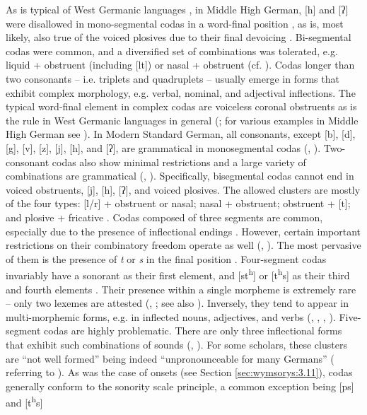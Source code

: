 \documentclass[output=paper,hidelinks]{langscibook}
\begin{document}
As is typical of West Germanic languages \citep[40]{van_oostendorp_germanic_2019}, in Middle High German, [h] and [ʔ] were disallowed in mono-segmental codas in a word-final position \citep[161]{paul_mittelhochdeutsche_2007}, as is, most likely, also true of the voiced plosives due to their final devoicing \citep[19]{paul_mittelhochdeutsche_2007}. Bi-segmental codas were common, and a diversified set of combinations was tolerated, e.g. liquid + obstruent (including [lt]) or nasal + obstruent (cf. \citealt[41--42]{van_oostendorp_germanic_2019}). Codas longer than two consonants – i.e. triplets and quadruplets – usually emerge in forms that exhibit complex morphology, e.g. verbal, nominal, and adjectival inflections. The typical word-final element in complex codas are voiceless coronal obstruents as is the rule in West Germanic languages in general (\citealt[43--44]{van_oostendorp_germanic_2019}; for various examples in Middle High German see \citealt[146--175]{paul_mittelhochdeutsche_2007}). In Modern Standard German, all consonants, except [b], [d], [g], [v], [z], [j], [h], and [ʔ], are grammatical in monosegmental codas (\citealt[59]{fox_structure_2005}, \citealt[41]{van_oostendorp_germanic_2019}). Two-consonant codas also show minimal restrictions and a large variety of combinations are grammatical (\citealt[356]{eisenberg_german_1994}, \citealt[124--125]{russ_german_1994}). Specifically, bisegmental codas cannot end in voiced obstruents, [j], [h], [ʔ], and voiced plosives. The allowed clusters are mostly of the four types: [l/r] + obstruent or nasal; nasal + obstruent; obstruent + [t]; and plosive + fricative \citep[59]{fox_structure_2005}. Codas composed of three segments are common, especially due to the presence of inflectional endings \citep[125]{russ_german_1994}. However, certain important restrictions on their combinatory freedom operate as well (\citealt[59]{fox_structure_2005}, \citealt[37]{fagan_german_2009}). The most pervasive of them is the presence of \textit{t} or \textit{s} in the final position \citep[59]{fox_structure_2005}. Four-segment codas invariably have a sonorant as their first element, and [st\textsuperscript{h}] or [t\textsuperscript{h}s] as their third and fourth elements \citep[37--38]{fagan_german_2009}. Their presence within a single morpheme is extremely rare – only two lexemes are attested (\citealt[59]{fox_structure_2005}, \citealt[3]{fagan_german_2009}; see also \citealt[121]{hall_syllable_1992}). Inversely, they tend to appear in multi-morphemic forms, e.g. in inflected nouns, adjectives, and verbs (\citealt[121]{hall_syllable_1992}, \citealt[125]{russ_german_1994}, \citealt[37--38]{fagan_german_2009}, \citealt[43--44]{van_oostendorp_germanic_2019}). Five-segment codas are highly problematic. There are only three inflectional forms that exhibit such combinations of sounds (\citealt[121]{hall_syllable_1992}, \citealt[125]{russ_german_1994}). For some scholars, these clusters are ``not well formed'' \citep[48]{wiese_phonology_1996} being indeed ``unpronounceable for many Germans'' (\citealt[51]{fagan_german_2009} referring to \citealt[121]{hall_syllable_1992}). As was the case of onsets (see Section \ref{sec:wymsorys:3.11}), codas generally conform to the sonority scale principle, a common exception being [ps] and [t\textsuperscript{h}s] 
\end{document}
